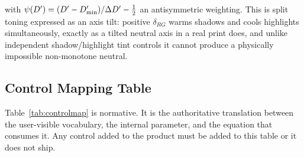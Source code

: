 with $\psi(D') = (D' - D_{\min}')/\Delta D' - \tfrac{1}{2}$ an antisymmetric
weighting. This is split toning expressed as an axis tilt: positive
$\delta_{RG}$ warms shadows and cools highlights simultaneously, exactly as a
tilted neutral axis in a real print does, and unlike independent
shadow/highlight tint controls it cannot produce a physically impossible
non-monotone neutral.

\subsection{Control Mapping Table}

Table~\ref{tab:controlmap} is normative. It is the authoritative translation
between the user-visible vocabulary, the internal parameter, and the equation
that consumes it. Any control added to the product must be added to this table
or it does not ship.

